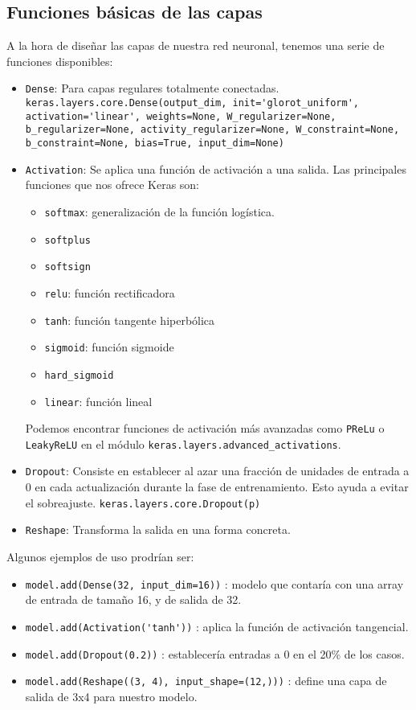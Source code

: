 \subsection{Funciones básicas de las capas}
A la hora de diseñar las capas de nuestra red neuronal, tenemos una serie de funciones disponibles:
\begin{itemize}
\item \lstinline{Dense}: Para capas regulares totalmente conectadas.\\
\lstinline{keras.layers.core.Dense(output_dim, init='glorot_uniform', activation='linear', weights=None, W_regularizer=None, b_regularizer=None, activity_regularizer=None, W_constraint=None, b_constraint=None, bias=True, input_dim=None)}
\item \lstinline{Activation}: Se aplica una función de activación a una salida. Las principales funciones que nos ofrece Keras son:
\begin{itemize}
\item \lstinline{softmax}: generalización de la función logística.
\item \lstinline{softplus}
\item \lstinline{softsign}
\item \lstinline{relu}: función rectificadora
\item \lstinline{tanh}: función tangente hiperbólica
\item \lstinline{sigmoid}: función sigmoide
\item \lstinline{hard_sigmoid}
\item \lstinline{linear}: función lineal
\end{itemize}
Podemos encontrar funciones de activación más avanzadas como \lstinline{PReLu} o \lstinline{LeakyReLU} en el módulo \lstinline{keras.layers.advanced_activations}.
\item \lstinline{Dropout}: Consiste en establecer al azar una fracción de unidades de entrada a 0 en cada actualización durante la fase de entrenamiento. Esto ayuda a evitar el sobreajuste.
\lstinline{keras.layers.core.Dropout(p)}
\item \lstinline{Reshape}: Transforma la salida en una forma concreta.
\end{itemize}
Algunos ejemplos de uso prodrían ser:
\begin{itemize}[noitemsep]
\item \lstinline{model.add(Dense(32, input_dim=16))} : modelo que contaría con una array de entrada de tamaño 16, y de salida de 32.
\item \lstinline{model.add(Activation('tanh'))} : aplica la función de activación tangencial.
\item \lstinline{model.add(Dropout(0.2))} : establecería entradas a 0 en el 20\% de los casos.
\item \lstinline{model.add(Reshape((3, 4), input_shape=(12,)))} : define una capa de salida de 3x4 para nuestro modelo.
\end{itemize}

